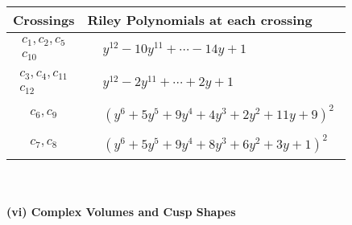 \documentclass[1p]{elsarticle_modified}
\theoremstyle{definition}
\begin{document}
\begin{tabular}{m{50pt}|m{274pt}}
Crossings & \hspace{64pt}Riley Polynomials at each crossing \\
\hline $$\begin{aligned}c_{1},c_{2},c_{5}\\c_{10}\end{aligned}$$&$\begin{aligned}
&y^{12}-10 y^{11}+\cdots-14 y+1
\end{aligned}$\\
\hline $$\begin{aligned}c_{3},c_{4},c_{11}\\c_{12}\end{aligned}$$&$\begin{aligned}
&y^{12}-2 y^{11}+\cdots+2 y+1
\end{aligned}$\\
\hline $$\begin{aligned}c_{6},c_{9}\end{aligned}$$&$\begin{aligned}
&(y^6+5 y^5+9 y^4+4 y^3+2 y^2+11 y+9)^2
\end{aligned}$\\
\hline $$\begin{aligned}c_{7},c_{8}\end{aligned}$$&$\begin{aligned}
&(y^6+5 y^5+9 y^4+8 y^3+6 y^2+3 y+1)^2
\end{aligned}$\\
\hline
\end{tabular}\\~\\
\newpage\flushleft \textbf{(vi) Complex Volumes and Cusp Shapes}
\end{document}
